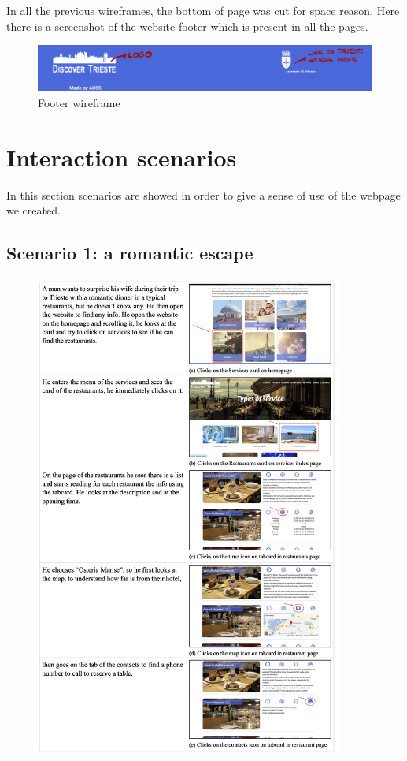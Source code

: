 \documentclass[table, 12pt]{article}
\begin{document}
In all the previous wireframes, the bottom of page was cut for space reason. Here there is a screenshot of the website footer which is present in all the pages.
\begin{figure}[H]
    \begin{center}
        \includegraphics[width=\textwidth]{assets/Wireframes/footer.png}
        \caption{Footer wireframe}
    \end{center}
\end{figure}

\newpage
\section{Interaction scenarios}
In this section scenarios are showed in order to give a sense of use of the webpage we created.
\subsection{Scenario 1: a romantic escape}
\begin{figure}[H]
    \begin{center}
        \includegraphics[width=0.9\textwidth]{assets/Scenarios/scenario1.png}
    \end{center}
\end{figure}
\end{document}
